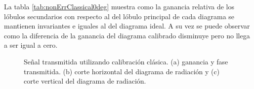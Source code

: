 La tabla \ref{tab:nonErrClassical0deg} muestra como la ganancia relativa de los lóbulos secundarios con respecto al del lóbulo
principal de cada diagrama se mantienen invariantes e iguales al del diagrama ideal. A su vez se puede observar como la diferencia
de la ganancia del diagrama calibrado disminuye pero no llega a ser igual a cero.
\begin{figure}[H]
	\centering

	\caption{Señal transmitida utilizando calibración clásica. (a) ganancia y fase transmitida. (b) corte horizontal del 
	diagrama de radiación y (c) corte vertical del diagrama de radiación.}
	\label{fig:nonErrClassical0deg}
\end{figure}

